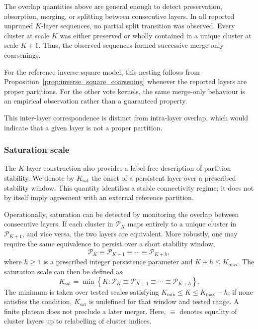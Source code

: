 \documentclass[review,12pt]{elsarticle}
\newcommand{\calP}{\mathcal{P}}
\begin{document}
The overlap quantities above are general enough to detect preservation,
absorption, merging, or splitting between consecutive layers. In all
reported unpruned $K$-layer sequences, no partial split transition was
observed. Every cluster at scale $K$ was
either preserved or wholly contained in a unique cluster at scale $K+1$.
Thus, the observed sequences formed successive merge-only coarsenings.

For the reference inverse-square model, this nesting follows from
Proposition~\ref{prop:inverse_square_coarsening} whenever the reported layers
are proper partitions. For the other vote kernels, the same merge-only
behaviour is an empirical observation rather than a guaranteed property.

This inter-layer correspondence is distinct from intra-layer overlap, which
would indicate that a given layer is not a proper partition.


\subsubsection{Saturation scale}

The $K$-layer construction also provides a label-free description of
partition stability. We denote by $K_{\mathrm{sat}}$ the onset of a
persistent layer over a prescribed stability window. This quantity
identifies a stable connectivity regime; it does not by itself imply
agreement with an external reference partition.

Operationally, saturation can be detected by monitoring the overlap between
consecutive layers. If each cluster in $\calP_K$ maps entirely to a unique
cluster in $\calP_{K+1}$, and vice versa, the two layers are equivalent.
More robustly, one may require the same equivalence to persist over a short
stability window,
\begin{equation}
\calP_K
\equiv
\calP_{K+1}
\equiv
\cdots
\equiv
\calP_{K+h},
\label{eq:partition_stability_window}
\end{equation}
where $h\geq1$ is a prescribed integer persistence parameter and
$K+h\leq K_{\max}$. The saturation scale can
then be defined as
\begin{equation}
K_{\mathrm{sat}}
=
\min
\left\{
K:
\calP_K
\equiv
\calP_{K+1}
\equiv
\cdots
\equiv
\calP_{K+h}
\right\}.
\label{eq:ksat}
\end{equation}
The minimum is taken over tested scales satisfying
$K_{\min}\leq K\leq K_{\max}-h$; if none satisfies the condition,
$K_{\mathrm{sat}}$ is undefined for that window and tested range. A finite
plateau does not preclude a later merger. Here, $\equiv$ denotes equality
of cluster layers up to relabelling of cluster indices.
\end{document}
